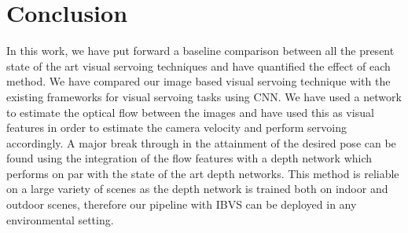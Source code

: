 \documentclass[letterpaper, 10 pt, conference]{ieeeconf}  %
\begin{document}
\section{Conclusion}
In this work, we have put forward a baseline comparison between all the present state of the art visual servoing techniques and have quantified the effect of each method. We have compared our image based visual servoing technique with the existing frameworks for visual servoing tasks using CNN. We have used a network to estimate the optical flow between the images and have used this as visual features in order to estimate the camera velocity and perform servoing accordingly. A major break through in the attainment of the desired pose can be found using the integration of the flow features with a depth network which performs on par with the state of the art depth networks. This method is reliable on a large variety of scenes as the depth network is trained both on indoor and outdoor scenes, therefore our pipeline with IBVS can be deployed in any environmental setting.



\end{document}
